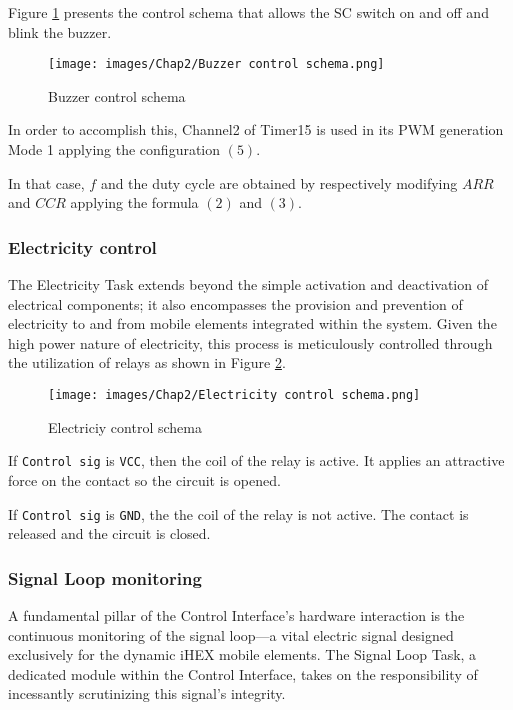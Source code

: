 Figure \ref{Buzzer control schema} presents the control schema that allows the SC switch on and off and blink the buzzer.

\begin{figure}[H]
\begin{center}
\texttt{[image: images/Chap2/Buzzer control schema.png]}\\
\caption{Buzzer control schema}
\label{Buzzer control schema}
\end{center}
\end{figure}

In order to accomplish this, Channel2 of Timer15 is used in its PWM generation Mode 1 applying the configuration $(5)$.

In that case, $f$ and the duty cycle are obtained by respectively modifying $ARR$ and $CCR$ applying the formula $(2)$ and $(3)$.

\subsubsection{Electricity control}
The Electricity Task extends beyond the simple activation and deactivation of electrical components; it also encompasses the provision and prevention of electricity to and from mobile elements integrated within the system. Given the high power nature of electricity, this process is meticulously controlled through the utilization of relays as shown in Figure \ref{Electricity control schema}.

\begin{figure}[H]
\begin{center}
\texttt{[image: images/Chap2/Electricity control schema.png]}\\
\caption{Electriciy control schema}
\label{Electricity control schema}
\end{center}
\end{figure}
If \texttt{Control sig} is \texttt{VCC}, then the coil of the relay is active. It applies an attractive force on the contact so the circuit is opened.

If \texttt{Control sig} is \texttt{GND}, the the coil of the relay is not active. The contact is released and the circuit is closed.

\subsubsection{Signal Loop monitoring}

A fundamental pillar of the Control Interface's hardware interaction is the continuous monitoring of the signal loop—a vital electric signal designed exclusively for the dynamic iHEX mobile elements. The Signal Loop Task, a dedicated module within the Control Interface, takes on the responsibility of incessantly scrutinizing this signal's integrity.

